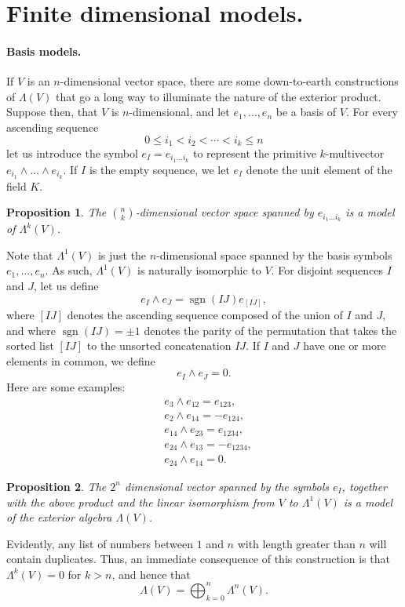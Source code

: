 \documentclass[12pt]{article}
\newcommand{\sgn}{\operatorname{sgn}}
\newtheorem{proposition}{Proposition}
\begin{document}
\section{Finite dimensional models.}
\paragraph{Basis models.}
If $V$ is an $n$-dimensional vector space, there are some
down-to-earth constructions of $\Lambda(V)$ that go a long way to
illuminate the nature of the exterior product.  Suppose then, that $V$
is $n$-dimensional, and let $e_1,\ldots,e_n$ be a basis of $V$. For
every ascending sequence \[0\leq i_1<i_2<\cdots<i_k\leq n\] let us
introduce the symbol $e_I=e_{i_1\dots i_k}$ to represent the primitive
$k$-multivector $e_{i_1}\wedge\ldots\wedge e_{i_k}$.  If $I$ is the
empty sequence, we let $e_I$ denote the unit element of the field
$K$.
\begin{proposition}
  The $\binom{n}{k}$-dimensional vector space spanned by $e_{i_1\dots
    i_k}$ is a model of $\Lambda^k(V)$.  
\end{proposition}
Note that $\Lambda^1(V)$ is just the $n$-dimensional space spanned by
the basis symbols $e_1,\dots,e_n$.  As such, $\Lambda^1(V)$ is
naturally isomorphic to $V$.  For disjoint sequences $I$ and $J$, let
us define
\[ e_I \wedge e_J = \sgn(IJ) e_{[IJ]},\] where $[IJ]$ denotes the
ascending sequence composed of the union of $I$ and $J$, and where
$\sgn(IJ)=\pm 1$ denotes the parity of the permutation that takes the
sorted list $[IJ]$ to the unsorted concatenation $IJ$. If $I$ and $J$
have one or more elements in common, we define
\[ e_I\wedge e_J = 0.\]
Here are some examples:
\begin{align*}
  &e_{3} \wedge e_{12} = e_{123},\\
  &e_{2}\wedge e_{14} = - e_{124},\\
  &e_{14} \wedge e_{23} = e_{1234},\\
  &e_{24} \wedge e_{13} = -e_{1234},\\
  &e_{24} \wedge e_{14} =0.
\end{align*}
\begin{proposition}
  The $2^n$ dimensional vector spanned by the symbols $e_I$, together
  with the above product and the linear isomorphism from $V$ to
  $\Lambda^1(V)$ is a model of the exterior algebra $\Lambda(V)$.
\end{proposition}

Evidently, any list of numbers between $1$ and $n$ with length greater
than $n$ will contain duplicates.  Thus, an immediate consequence of
this construction is that $\Lambda^k(V)=0$ for $k>n$, and hence that
\[ \Lambda(V) = \bigoplus_{k=0}^n \Lambda^n(V).\]
\end{document}
